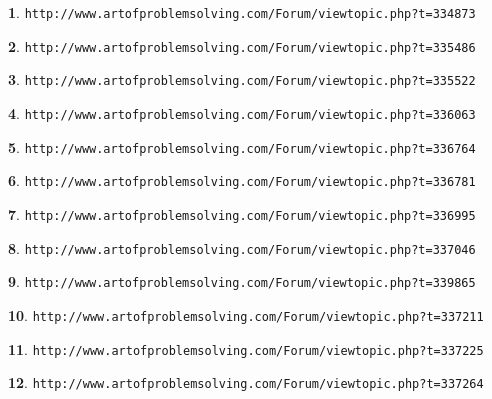 \documentclass{article}
\theoremstyle{definition}
\newtheorem{s}{}
\begin{document}
\begin{s}
\texttt{http://www.artofproblemsolving.com/Forum/viewtopic.php?t=334873}
\end{s}


\begin{s}
\texttt{http://www.artofproblemsolving.com/Forum/viewtopic.php?t=335486}
\end{s}



\begin{s}
\texttt{http://www.artofproblemsolving.com/Forum/viewtopic.php?t=335522}
\end{s}


\begin{s}
\texttt{http://www.artofproblemsolving.com/Forum/viewtopic.php?t=336063}
\end{s}



\begin{s}
\texttt{http://www.artofproblemsolving.com/Forum/viewtopic.php?t=336764}
\end{s}


\begin{s}
\texttt{http://www.artofproblemsolving.com/Forum/viewtopic.php?t=336781}
\end{s}



\begin{s}
\texttt{http://www.artofproblemsolving.com/Forum/viewtopic.php?t=336995}
\end{s}


\begin{s}
\texttt{http://www.artofproblemsolving.com/Forum/viewtopic.php?t=337046}
\end{s}

\begin{s}
\texttt{http://www.artofproblemsolving.com/Forum/viewtopic.php?t=339865}
\end{s}


\begin{s}
\texttt{http://www.artofproblemsolving.com/Forum/viewtopic.php?t=337211}
\end{s}



\begin{s}
\texttt{http://www.artofproblemsolving.com/Forum/viewtopic.php?t=337225}
\end{s}


\begin{s}
\texttt{http://www.artofproblemsolving.com/Forum/viewtopic.php?t=337264}
\end{s}
\end{document}

